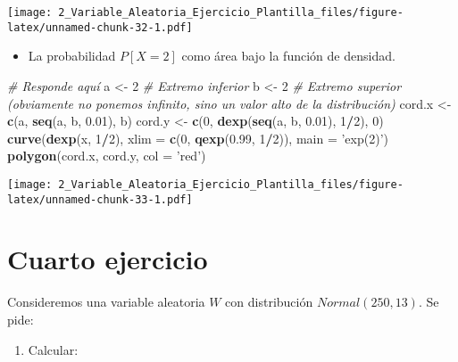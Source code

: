 \documentclass[
]{article}
\newenvironment{Shaded}{\begin{snugshade}}{\end{snugshade}}
\newcommand{\CommentTok}[1]{\textcolor[rgb]{0.56,0.35,0.01}{\textit{#1}}}
\newcommand{\DataTypeTok}[1]{\textcolor[rgb]{0.13,0.29,0.53}{#1}}
\newcommand{\DecValTok}[1]{\textcolor[rgb]{0.00,0.00,0.81}{#1}}
\newcommand{\FloatTok}[1]{\textcolor[rgb]{0.00,0.00,0.81}{#1}}
\newcommand{\KeywordTok}[1]{\textcolor[rgb]{0.13,0.29,0.53}{\textbf{#1}}}
\newcommand{\NormalTok}[1]{#1}
\newcommand{\OperatorTok}[1]{\textcolor[rgb]{0.81,0.36,0.00}{\textbf{#1}}}
\newcommand{\StringTok}[1]{\textcolor[rgb]{0.31,0.60,0.02}{#1}}
\providecommand{\tightlist}{%
  \setlength{\itemsep}{0pt}\setlength{\parskip}{0pt}}
\begin{document}
\texttt{[image: 2\_Variable\_Aleatoria\_Ejercicio\_Plantilla\_files/figure-latex/unnamed-chunk-32-1.pdf]}

\begin{itemize}
\tightlist
\item
  La probabilidad \(P [X = 2]\) como área bajo la función de densidad.
\end{itemize}

\begin{Shaded}
\begin{Highlighting}[]
\CommentTok{# Responde aquí}
\NormalTok{a <-}\StringTok{ }\DecValTok{2} \CommentTok{# Extremo inferior}
\NormalTok{b <-}\StringTok{ }\DecValTok{2} \CommentTok{# Extremo superior (obviamente no ponemos infinito, sino un valor alto de la distribución)}
\NormalTok{cord.x <-}\StringTok{ }\KeywordTok{c}\NormalTok{(a, }\KeywordTok{seq}\NormalTok{(a, b, }\FloatTok{0.01}\NormalTok{), b) }
\NormalTok{cord.y <-}\StringTok{ }\KeywordTok{c}\NormalTok{(}\DecValTok{0}\NormalTok{, }\KeywordTok{dexp}\NormalTok{(}\KeywordTok{seq}\NormalTok{(a, b, }\FloatTok{0.01}\NormalTok{), }\DecValTok{1}\OperatorTok{/}\DecValTok{2}\NormalTok{), }\DecValTok{0}\NormalTok{) }
\KeywordTok{curve}\NormalTok{(}\KeywordTok{dexp}\NormalTok{(x, }\DecValTok{1}\OperatorTok{/}\DecValTok{2}\NormalTok{), }\DataTypeTok{xlim =} \KeywordTok{c}\NormalTok{(}\DecValTok{0}\NormalTok{, }\KeywordTok{qexp}\NormalTok{(}\FloatTok{0.99}\NormalTok{, }\DecValTok{1}\OperatorTok{/}\DecValTok{2}\NormalTok{)), }\DataTypeTok{main =} \StringTok{'exp(2)'}\NormalTok{) }
\KeywordTok{polygon}\NormalTok{(cord.x, cord.y, }\DataTypeTok{col =} \StringTok{'red'}\NormalTok{)}
\end{Highlighting}
\end{Shaded}

\texttt{[image: 2\_Variable\_Aleatoria\_Ejercicio\_Plantilla\_files/figure-latex/unnamed-chunk-33-1.pdf]}

\hypertarget{cuarto-ejercicio}{%
\section{Cuarto ejercicio}\label{cuarto-ejercicio}}

Consideremos una variable aleatoria \(W\) con distribución
\(Normal(250, 13)\). Se pide:

\begin{enumerate}
\def\labelenumi{\arabic{enumi}.}
\tightlist
\item
  Calcular:
\end{enumerate}
\end{document}
